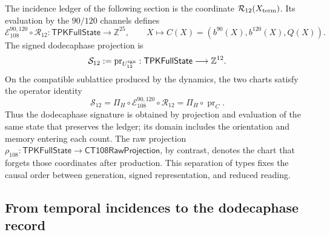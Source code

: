 The incidence ledger of the following section is the coordinate
\(\mathcal R_{12}(X_{\rm term})\). Its evaluation by the
\(90/120\) channels defines
\[
 \mathcal E_{108}^{90,120}\circ\mathcal R_{12}:
 \mathsf{TPKFullState}\longrightarrow\mathbb Z^{25},
 \qquad
 X\longmapsto C(X)=(b^{90}(X),b^{120}(X),Q(X)).
\]
The signed dodecaphase projection is
\[
 \mathcal S_{12}:=\operatorname{pr}_{U_{12}^{\rm sgn}}:
 \mathsf{TPKFullState}\longrightarrow\mathbb Z^{12}.
\]
On the compatible sublattice produced by the dynamics, the two charts
satisfy the operator identity
\begin{equation}
 \mathcal S_{12}
 =\Pi_H\circ\mathcal E_{108}^{90,120}\circ\mathcal R_{12}
 =\Pi_H\circ\operatorname{pr}_{C}.
 \label{vi:dep:identidad-productor-e108}
\end{equation}
Thus the dodecaphase signature is obtained by projection and evaluation of the same
state that preserves the ledger; its domain includes the orientation and memory
entering each count. The raw projection
\(\rho_{108}:\mathsf{TPKFullState}\to\mathsf{CT108RawProjection}\),
by contrast, denotes the chart that forgets those coordinates after
production. This separation of types fixes the causal order between generation,
signed representation, and reduced reading.

\subsection{From temporal incidences to the dodecaphase record}
\label{vi:dep:registro}\label{subsec:k-registro-integral}

